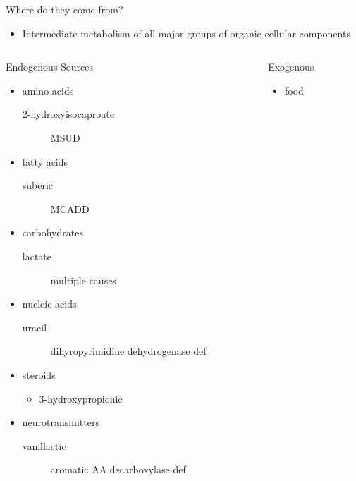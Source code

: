 \documentclass[presentation, smaller]{beamer}
\begin{document}
\begin{frame}[label={sec:orgheadline6}]{Where do they come from?}
\begin{itemize}
\item Intermediate metabolism of all major groups of organic cellular
components
\end{itemize}

\begin{columns}
\begin{column}{0.45\columnwidth}
\begin{block}{Endogenous Sources}
\begin{itemize}
\item amino acids
\begin{description}
\item[{2-hydroxyisocaproate}] MSUD
\end{description}
\item fatty acids
\begin{description}
\item[{suberic}] MCADD
\end{description}
\item carbohydrates
\begin{description}
\item[{lactate}] multiple causes
\end{description}
\item nucleic acids
\begin{description}
\item[{uracil}] dihyropyrimidine dehydrogenase def
\end{description}
\item steroids
\begin{itemize}
\item 3-hydroxypropionic
\end{itemize}
\item neurotransmitters
\begin{description}
\item[{vanillactic}] aromatic AA decarboxylase def
\end{description}
\end{itemize}
\end{block}
\end{column}
\begin{column}{0.5\columnwidth}
\begin{block}{Exogenous}
\begin{itemize}
\item food
\begin{itemize}

\end{itemize}
\end{itemize}
\end{block}
\end{column}
\end{columns}
\end{frame}
\end{document}
